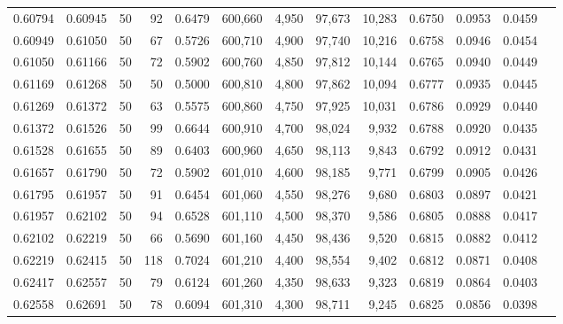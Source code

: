\begin{tabular}{rrrrrrrrrrrrr}
0.60794 & 0.60945 &    50 &  92 &                                     0.6479 & 600,660 &   4,950 &  97,673 &  10,283 & 0.6750 & 0.0953 & 0.0459 \\
0.60949 & 0.61050 &    50 &  67 &                                     0.5726 & 600,710 &   4,900 &  97,740 &  10,216 & 0.6758 & 0.0946 & 0.0454 \\
0.61050 & 0.61166 &    50 &  72 &                                     0.5902 & 600,760 &   4,850 &  97,812 &  10,144 & 0.6765 & 0.0940 & 0.0449 \\
0.61169 & 0.61268 &    50 &  50 &                                     0.5000 & 600,810 &   4,800 &  97,862 &  10,094 & 0.6777 & 0.0935 & 0.0445 \\
0.61269 & 0.61372 &    50 &  63 &                                     0.5575 & 600,860 &   4,750 &  97,925 &  10,031 & 0.6786 & 0.0929 & 0.0440 \\
0.61372 & 0.61526 &    50 &  99 &                                     0.6644 & 600,910 &   4,700 &  98,024 &   9,932 & 0.6788 & 0.0920 & 0.0435 \\
0.61528 & 0.61655 &    50 &  89 &                                     0.6403 & 600,960 &   4,650 &  98,113 &   9,843 & 0.6792 & 0.0912 & 0.0431 \\
0.61657 & 0.61790 &    50 &  72 &                                     0.5902 & 601,010 &   4,600 &  98,185 &   9,771 & 0.6799 & 0.0905 & 0.0426 \\
0.61795 & 0.61957 &    50 &  91 &                                     0.6454 & 601,060 &   4,550 &  98,276 &   9,680 & 0.6803 & 0.0897 & 0.0421 \\
0.61957 & 0.62102 &    50 &  94 &                                     0.6528 & 601,110 &   4,500 &  98,370 &   9,586 & 0.6805 & 0.0888 & 0.0417 \\
0.62102 & 0.62219 &    50 &  66 &                                     0.5690 & 601,160 &   4,450 &  98,436 &   9,520 & 0.6815 & 0.0882 & 0.0412 \\
0.62219 & 0.62415 &    50 & 118 &                                     0.7024 & 601,210 &   4,400 &  98,554 &   9,402 & 0.6812 & 0.0871 & 0.0408 \\
0.62417 & 0.62557 &    50 &  79 &                                     0.6124 & 601,260 &   4,350 &  98,633 &   9,323 & 0.6819 & 0.0864 & 0.0403 \\
0.62558 & 0.62691 &    50 &  78 &                                     0.6094 & 601,310 &   4,300 &  98,711 &   9,245 & 0.6825 & 0.0856 & 0.0398 \\

\end{tabular}
